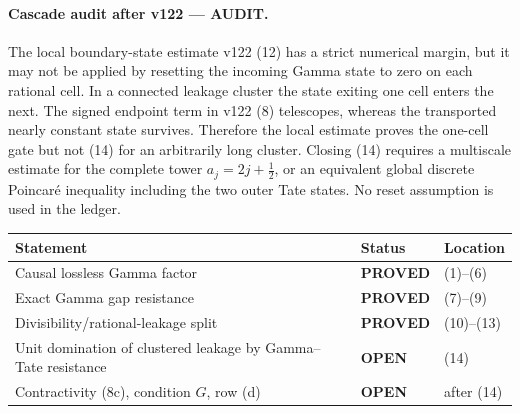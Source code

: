 \documentclass[11pt]{article}
\newcommand{\PROVED}{\textcolor{green!40!black}{\textbf{PROVED}}}
\newcommand{\OPEN}{\textcolor{red!70!black}{\textbf{OPEN}}}
\newcommand{\AUDIT}{\textcolor{orange!70!black}{\textbf{AUDIT}}}
\begin{document}
\paragraph{Cascade audit after v122 --- \AUDIT.}
The local boundary-state estimate v122 (12) has a strict numerical margin,
but it may not be applied by resetting the incoming Gamma state to zero on
each rational cell.  In a connected leakage cluster the state exiting one
cell enters the next.  The signed endpoint term in v122 (8) telescopes,
whereas the transported nearly constant state survives.  Therefore the
local estimate proves the one-cell gate but not (14) for an arbitrarily
long cluster.  Closing (14) requires a multiscale estimate for the complete
tower $a_j=2j+\frac12$, or an equivalent global discrete Poincar\'e
inequality including the two outer Tate states.  No reset assumption is
used in the ledger.

\begin{center}
\begin{tabular}{>{\raggedright\arraybackslash}p{.55\linewidth}
                >{\centering\arraybackslash}p{.15\linewidth}
                >{\raggedright\arraybackslash}p{.20\linewidth}}
\toprule
Statement & Status & Location \\
\midrule
Causal lossless Gamma factor & \PROVED & (1)--(6) \\
Exact Gamma gap resistance & \PROVED & (7)--(9) \\
Divisibility/rational-leakage split & \PROVED & (10)--(13) \\
Unit domination of clustered leakage by Gamma--Tate resistance & \OPEN & (14) \\
Contractivity (8c), condition $G$, row (d) & \OPEN & after (14) \\
\bottomrule
\end{tabular}
\end{center}
\end{document}
